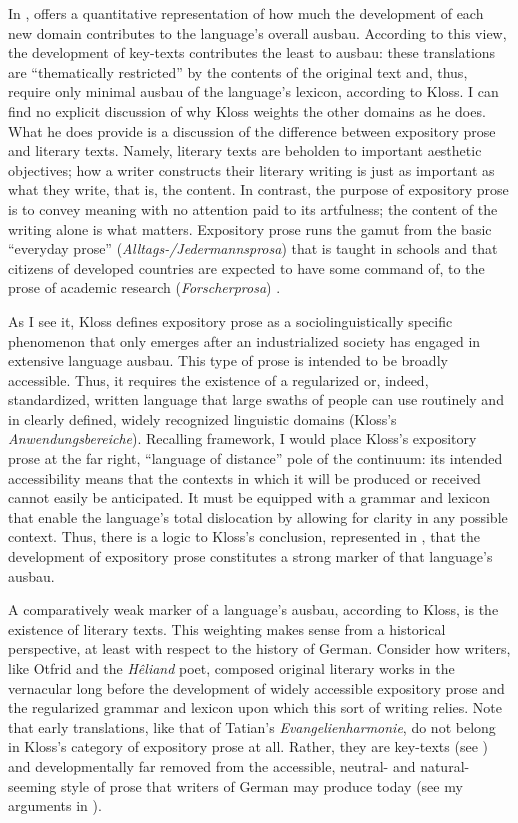 \noindent In , \citet[39]{Kloss1978} offers a quantitative representation of how much the development of each new domain contributes to the language’s overall ausbau. According to this view, the development of key-texts contributes the least to ausbau: these translations are “thematically restricted” by the contents of the original text and, thus, require only minimal ausbau of the language’s lexicon, according to Kloss. I can find no explicit discussion of why Kloss weights the other domains as he does. What he does provide is a discussion of the difference between expository prose and literary texts. Namely, literary texts are beholden to important aesthetic objectives; how a writer constructs their literary writing is just as important as what they write, that is, the content. In contrast, the purpose of expository prose is to convey meaning with no attention paid to its artfulness; the content of the writing alone is what matters. Expository prose runs the gamut from the basic “everyday prose” (\textit{Alltags-\slash Jedermannsprosa}) that is taught in schools and that citizens of developed countries are expected to have some command of, to the prose of academic research (\textit{Forscherprosa}) \citep[41--45]{Kloss1978}.

As I see it, Kloss defines expository prose as a sociolinguistically specific phenomenon that only emerges after an industrialized society has engaged in extensive language ausbau. This type of prose is intended to be broadly accessible. Thus, it requires the existence of a regularized or, indeed, standardized, written language that large swaths of people can use routinely and in clearly defined, widely recognized linguistic domains (Kloss’s \textit{Anwendungsbereiche}). Recalling  framework, I would place Kloss’s expository prose at the far right, “language of distance” pole of the continuum: its intended accessibility means that the contexts in which it will be produced or received cannot easily be anticipated. It must be equipped with a grammar and lexicon that enable the language’s total dislocation by allowing for clarity in any possible context. Thus, there is a logic to Kloss’s conclusion, represented in , that the development of expository prose constitutes a strong marker of that language’s ausbau.

A comparatively weak marker of a language’s ausbau, according to Kloss, is the existence of literary texts. This weighting makes sense from a historical perspective, at least with respect to the history of German. Consider how writers, like Otfrid and the \textit{Hêliand} poet, composed original literary works in the vernacular long before the development of widely accessible expository prose and the regularized grammar and lexicon upon which this sort of writing relies. Note that early translations, like that of Tatian’s \textit{Evangelienharmonie}, do not belong in Kloss’s category of expository prose at all. Rather, they are key-texts (see ) and developmentally far removed from the accessible, neutral- and natural-seeming style of prose that writers of German may produce today (see my arguments in ).

